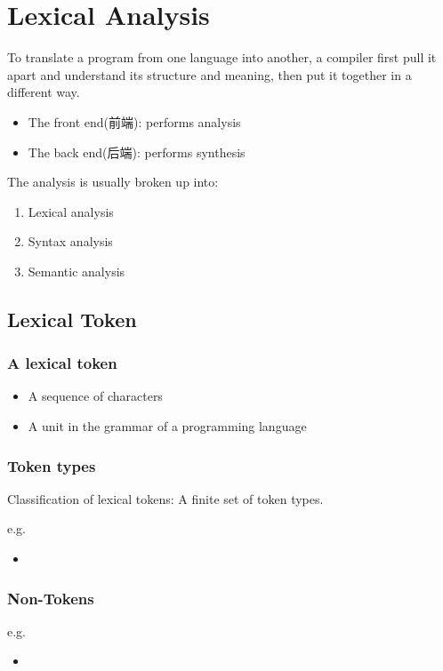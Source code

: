 \newpage
\section{Lexical Analysis}
To translate a program from one language into another, a compiler first pull it apart and understand its structure and meaning, then put it together in a different way.

\begin{itemize}
    \item The front end(前端): performs analysis
    \item The back end(后端): performs synthesis
\end{itemize}

The analysis is usually broken up into:
\begin{enumerate}
    \item Lexical analysis
    \item Syntax analysis
    \item Semantic analysis
\end{enumerate}


\subsection{Lexical Token}
\subsubsection{A lexical token}
\begin{itemize}
    \item A sequence of characters
    \item A unit in the grammar of a programming language
\end{itemize}

\subsubsection{Token types}
Classification of lexical tokens: A finite set of token types.

e.g.
\begin{itemize}
    \item %
\end{itemize}


\subsubsection{Non-Tokens}
e.g.
\begin{itemize}
    \item %
\end{itemize}

